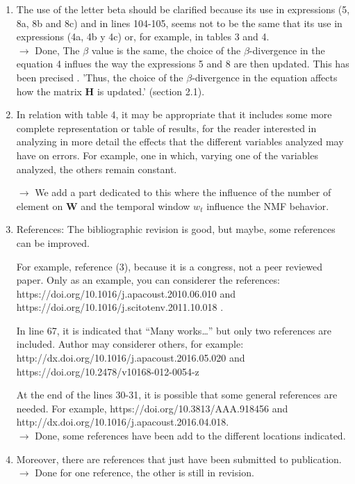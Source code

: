 \documentclass[10pt]{article}
\begin{document}
\begin{enumerate}
\item The use of the letter beta should be clarified because its use in expressions (5, 8a, 8b and 8c) and in lines 104-105, seems not to be the same that its use in expressions (4a, 4b y 4c) or, for example, in tables 3 and 4.\\
$\rightarrow$ Done, The $\beta$ value is the same, the choice of the $\beta$-divergence in the equation 4 influes the way the expressions 5 and 8 are then updated. This has been precised . 'Thus, the choice of the $\beta$-divergence in the equation affects how the matrix $\mathbf{H}$ is updated.' (section 2.1).

\item In relation with table 4, it may be appropriate that it includes some more complete representation or table of results, for the reader interested in analyzing in more detail the effects that the different variables analyzed may have on errors. For example, one in which, varying one of the variables analyzed, the others remain constant.

$\rightarrow$ We add a part dedicated to this where the influence of the number of element on $\mathbf{W}$ and the temporal window $w_t$ influence the NMF behavior.

\item References: The bibliographic revision is good, but maybe, some references can be improved.

For example, reference (3), because it is a congress, not a peer reviewed paper. Only as an example, you can considerer the references: https://doi.org/10.1016/j.apacoust.2010.06.010 and https://doi.org/10.1016/j.scitotenv.2011.10.018 .

In line 67, it is indicated that “Many works…” but only two references are included. Author may considerer others, for example: 
http://dx.doi.org/10.1016/j.apacoust.2016.05.020 and https://doi.org/10.2478/v10168-012-0054-z

At the end of the lines 30-31, it is possible that some general references are needed. For example, 
https://doi.org/10.3813/AAA.918456 and http://dx.doi.org/10.1016/j.apacoust.2016.04.018.\\
$\rightarrow$ Done, some references have been add to the different locations indicated.


\item Moreover, there are references that just have been submitted to publication. \\
$\rightarrow$ Done for one reference, the other is still in revision.

\end{enumerate}
\end{document}
